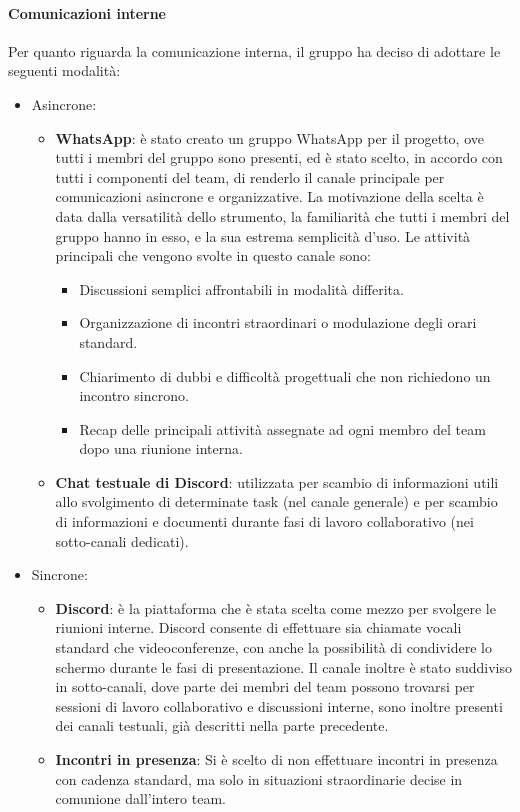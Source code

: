 \documentclass[documento]{gpt}
\begin{document}
	\paragraph{Comunicazioni interne}
	Per quanto riguarda la comunicazione interna, il gruppo ha deciso di adottare le seguenti modalità:
	\begin{itemize}
		\item Asincrone: \begin{itemize}
			\item \textbf{WhatsApp}: è stato creato un gruppo WhatsApp per il progetto, ove tutti i membri del gruppo sono presenti, ed è stato scelto, in accordo con tutti i componenti del team, di renderlo il canale principale per comunicazioni asincrone e organizzative. La motivazione della scelta è data dalla versatilità dello strumento, la familiarità che tutti i membri del gruppo hanno in esso, e la sua estrema semplicità d'uso. Le attività principali che vengono svolte in questo canale sono:\begin{itemize}
				\item Discussioni semplici affrontabili in modalità differita.
				\item Organizzazione di incontri straordinari o modulazione degli orari standard.
				\item Chiarimento di dubbi e difficoltà progettuali che non richiedono un incontro sincrono.
				\item Recap delle principali attività assegnate ad ogni membro del team dopo una riunione interna.
			\end{itemize}
			\item \textbf{Chat testuale di Discord}: utilizzata per scambio di informazioni utili allo svolgimento di determinate task (nel canale generale) e per scambio di informazioni e documenti durante fasi di lavoro collaborativo (nei sotto-canali dedicati).
		\end{itemize}
		\item Sincrone: \begin{itemize}
			\item \textbf{Discord}: è la piattaforma che è stata scelta come mezzo per svolgere le riunioni interne. Discord consente di effettuare sia chiamate vocali standard che videoconferenze, con anche la possibilità di condividere lo schermo durante le fasi di presentazione. Il canale inoltre è stato suddiviso in sotto-canali, dove parte dei membri del team possono trovarsi per sessioni di lavoro collaborativo e discussioni interne, sono inoltre presenti dei canali testuali, già descritti nella parte precedente.
			\item \textbf{Incontri in presenza}: Si è scelto di non effettuare incontri in presenza con cadenza standard, ma solo in situazioni straordinarie decise in comunione dall'intero team.
		\end{itemize}
	\end{itemize}
\end{document}
